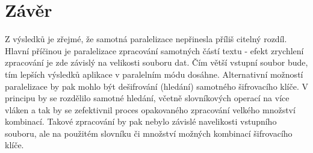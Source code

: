 \documentclass{article}
\begin{document}
\section{Závěr}
Z výsledků je zřejmé, že samotná paralelizace nepřinesla příliš citelný rozdíl. Hlavní příčinou je paralelizace zpracování samotných částí textu - efekt zrychlení zpracování je zde závislý na velikosti souboru dat. Čím větší vstupní soubor bude, tím lepších výsledků aplikace v paralelním módu dosáhne.
Alternativní možností paralelizace by pak mohlo být dešifrování (hledání) samotného šifrovacího klíče. V principu by se rozdělilo samotné hledání, včetně slovníkových operací na více vláken a tak by se zefektivnil proces opakovaného zpracování velkého množství kombinací. Takové zpracování by pak nebylo závislé navelikosti vstupního souboru, ale na použitém slovníku či množství možných kombinací šifrovacího klíče.
\end{document}
